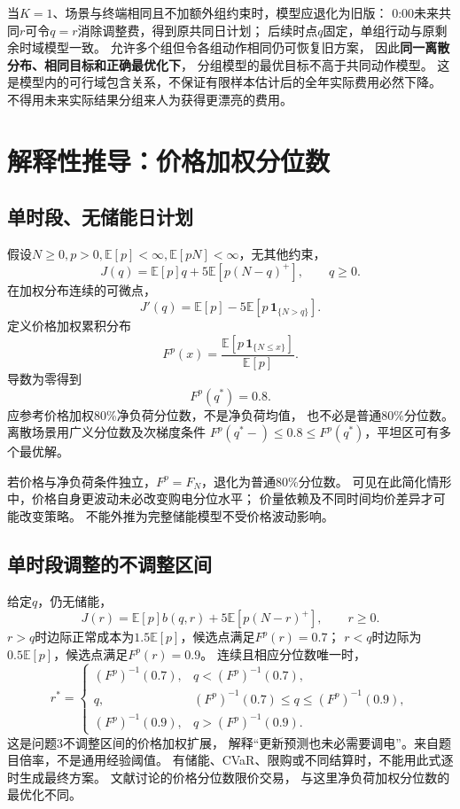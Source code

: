 \documentclass[UTF8,11pt]{ctexart}
\newcommand{\E}{\mathbb E}
\begin{document}
当$K=1$、场景与终端相同且不加额外组约束时，模型应退化为旧版：
0:00未来共同$r$可令$q=r$消除调整费，得到原共同日计划；
后续时点$q$固定，单组行动与原剩余时域模型一致。
允许多个组但令各组动作相同仍可恢复旧方案，
因此\textbf{同一离散分布、相同目标和正确最优化下}，
分组模型的最优目标不高于共同动作模型。
这是模型内的可行域包含关系，不保证有限样本估计后的全年实际费用必然下降。
不得用未来实际结果分组来人为获得更漂亮的费用。

\section{解释性推导：价格加权分位数}
\subsection{单时段、无储能日计划}
假设$N\geq0,p>0,\E[p]<\infty,\E[pN]<\infty$，无其他约束，
\begin{equation}
 J(q)=\E[p]q+5\E[p(N-q)^+],\qquad q\geq0.
\end{equation}
在加权分布连续的可微点，
\begin{equation}
 J'(q)=\E[p]-5\E[p\,\mathbf1_{\{N>q\}}].
\end{equation}
定义价格加权累积分布
\begin{equation}
 F^p(x)=\frac{\E[p\,\mathbf1_{\{N\leq x\}}]}{\E[p]}.
\end{equation}
导数为零得到
\begin{equation}\label{eq:q80}
 F^p(q^*)=0.8.
\end{equation}
应参考价格加权80\%净负荷分位数，不是净负荷均值，
也不必是普通80\%分位数。离散场景用广义分位数及次梯度条件
$F^p(q^*-)\leq0.8\leq F^p(q^*)$，平坦区可有多个最优解。

若价格与净负荷条件独立，$F^p=F_N$，退化为普通80\%分位数。
可见在此简化情形中，价格自身更波动未必改变购电分位水平；
价量依赖及不同时间均价差异才可能改变策略。
不能外推为完整储能模型不受价格波动影响。

\subsection{单时段调整的不调整区间}
给定$q$，仍无储能，
\begin{equation}
 J(r)=\E[p]b(q,r)+5\E[p(N-r)^+],\qquad r\geq0.
\end{equation}
$r>q$时边际正常成本为$1.5\E[p]$，候选点满足$F^p(r)=0.7$；
$r<q$时边际为$0.5\E[p]$，候选点满足$F^p(r)=0.9$。
连续且相应分位数唯一时，
\begin{equation}\label{eq:band}
 r^*=\begin{cases}
 (F^p)^{-1}(0.7),&q<(F^p)^{-1}(0.7),\\
 q,&(F^p)^{-1}(0.7)\leq q\leq(F^p)^{-1}(0.9),\\
 (F^p)^{-1}(0.9),&q>(F^p)^{-1}(0.9).
 \end{cases}
\end{equation}
这是问题3不调整区间的价格加权扩展，
解释“更新预测也未必需要调电”。来自题目倍率，不是通用经验阈值。
有储能、CVaR、限购或不同结算时，不能用此式逐时生成最终方案。
文献\cite{hirsch2026}讨论的价格分位数限价交易，
与这里净负荷加权分位数的最优化不同。
\end{document}
